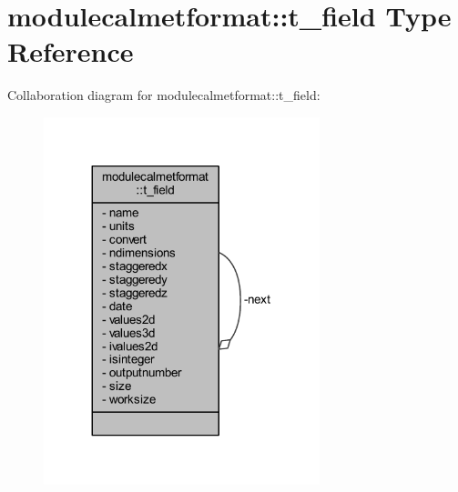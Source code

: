 \hypertarget{structmodulecalmetformat_1_1t__field}{}\section{modulecalmetformat\+:\+:t\+\_\+field Type Reference}
\label{structmodulecalmetformat_1_1t__field}


Collaboration diagram for modulecalmetformat\+:\+:t\+\_\+field\+:\nopagebreak
\begin{figure}[H]
\begin{center}
\leavevmode
\includegraphics[width=227pt]{structmodulecalmetformat_1_1t__field__coll__graph}
\end{center}
\end{figure}
